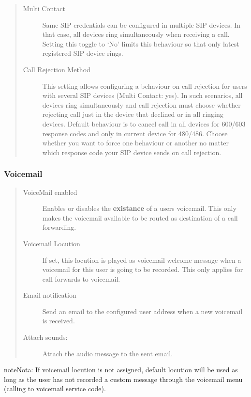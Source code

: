 \documentclass[letterpaper,10pt,spanish]{sphinxmanual}
\begin{document}
\begin{quote}
\begin{description}
\item[{Multi Contact}] \leavevmode
Same SIP credentials can be configured in multiple SIP devices. In that case, all devices ring
simultaneously when receiving a call. Setting this toggle to `No' limits this behaviour so that
only latest registered SIP device rings.

\item[{Call Rejection Method}] \leavevmode
This setting allows configuring a behaviour on call rejection for users with several
SIP devices (Multi Contact: yes). In such scenarios, all devices ring simultaneously and call rejection must
choose whether rejecting call just in the device that declined or in all ringing devices.
Default behaviour is to cancel call in all devices for 600/603 response codes and only in
current device for 480/486. Choose whether you want to force one behaviour or another no
matter which response code your SIP device sends on call rejection.

\end{description}
\end{quote}


\subsubsection{Voicemail}
\label{administration_portal/client/vpbx/users:voicemail}\begin{quote}
\begin{description}
\item[{VoiceMail enabled}] \leavevmode
Enables or disables the \textbf{existance} of a users voicemail.
This only makes the voicemail available to be routed as destination of a call forwarding.

\item[{Voicemail Locution}] \leavevmode
If set, this locution is played as voicemail welcome message when a voicemail
for this user is going to be recorded. This only applies for call forwards
to voicemail.

\item[{Email notification}] \leavevmode
Send an email to the configured user address when a new voicemail is
received.

\item[{Attach sounds:}] \leavevmode
Attach the audio message to the sent email.

\end{description}
\end{quote}

\begin{notice}{note}{Nota:}
If voicemail locution is not assigned, default locution will be used as long as
the user has not recorded a custom message through the voicemail menu (calling to
voicemail service code).
\end{notice}
\end{document}
